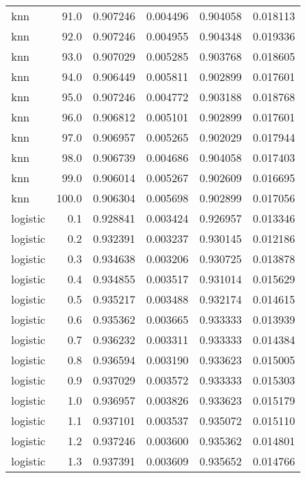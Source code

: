 \begin{tabular}{lrrrrr}
     knn &       91.0 &    0.907246 &   0.004496 &   0.904058 &  0.018113 \\
     knn &       92.0 &    0.907246 &   0.004955 &   0.904348 &  0.019336 \\
     knn &       93.0 &    0.907029 &   0.005285 &   0.903768 &  0.018605 \\
     knn &       94.0 &    0.906449 &   0.005811 &   0.902899 &  0.017601 \\
     knn &       95.0 &    0.907246 &   0.004772 &   0.903188 &  0.018768 \\
     knn &       96.0 &    0.906812 &   0.005101 &   0.902899 &  0.017601 \\
     knn &       97.0 &    0.906957 &   0.005265 &   0.902029 &  0.017944 \\
     knn &       98.0 &    0.906739 &   0.004686 &   0.904058 &  0.017403 \\
     knn &       99.0 &    0.906014 &   0.005267 &   0.902609 &  0.016695 \\
     knn &      100.0 &    0.906304 &   0.005698 &   0.902899 &  0.017056 \\
logistic &        0.1 &    0.928841 &   0.003424 &   0.926957 &  0.013346 \\
logistic &        0.2 &    0.932391 &   0.003237 &   0.930145 &  0.012186 \\
logistic &        0.3 &    0.934638 &   0.003206 &   0.930725 &  0.013878 \\
logistic &        0.4 &    0.934855 &   0.003517 &   0.931014 &  0.015629 \\
logistic &        0.5 &    0.935217 &   0.003488 &   0.932174 &  0.014615 \\
logistic &        0.6 &    0.935362 &   0.003665 &   0.933333 &  0.013939 \\
logistic &        0.7 &    0.936232 &   0.003311 &   0.933333 &  0.014384 \\
logistic &        0.8 &    0.936594 &   0.003190 &   0.933623 &  0.015005 \\
logistic &        0.9 &    0.937029 &   0.003572 &   0.933333 &  0.015303 \\
logistic &        1.0 &    0.936957 &   0.003826 &   0.933623 &  0.015179 \\
logistic &        1.1 &    0.937101 &   0.003537 &   0.935072 &  0.015110 \\
logistic &        1.2 &    0.937246 &   0.003600 &   0.935362 &  0.014801 \\
logistic &        1.3 &    0.937391 &   0.003609 &   0.935652 &  0.014766 \\

\end{tabular}
